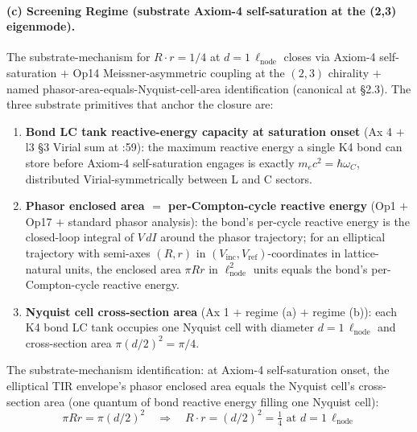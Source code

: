 \paragraph{(c) Screening Regime (substrate Axiom-4 self-saturation at the (2,3) eigenmode).}
The substrate-mechanism for $R \cdot r = 1/4$ at $d = 1\,\ell_\text{node}$ closes via Axiom-4 self-saturation $+$ Op14 Meissner-asymmetric coupling at the $(2,3)$ chirality $+$ named phasor-area-equals-Nyquist-cell-area identification (canonical at  \S2.3). The three substrate primitives that anchor the closure are:

\begin{enumerate}
\item \textbf{Bond LC tank reactive-energy capacity at saturation onset} (Ax 4 $+$ l3 \S3 Virial sum at :59): the maximum reactive energy a single K4 bond can store before Axiom-4 self-saturation engages is exactly $m_e c^2 = \hbar \omega_C$, distributed Virial-symmetrically between L and C sectors.
\item \textbf{Phasor enclosed area $=$ per-Compton-cycle reactive energy} (Op1 $+$ Op17 $+$ standard phasor analysis): the bond's per-cycle reactive energy is the closed-loop integral of $V\, dI$ around the phasor trajectory; for an elliptical trajectory with semi-axes $(R, r)$ in $(V_\text{inc}, V_\text{ref})$-coordinates in lattice-natural units, the enclosed area $\pi R r$ in $\ell_\text{node}^2$ units equals the bond's per-Compton-cycle reactive energy.
\item \textbf{Nyquist cell cross-section area} (Ax 1 $+$ regime (a) $+$ regime (b)): each K4 bond LC tank occupies one Nyquist cell with diameter $d = 1\,\ell_\text{node}$ and cross-section area $\pi(d/2)^2 = \pi/4$.
\end{enumerate}

The substrate-mechanism identification: at Axiom-4 self-saturation onset, the elliptical TIR envelope's phasor enclosed area equals the Nyquist cell's cross-section area (one quantum of bond reactive energy filling one Nyquist cell):
\begin{equation}
    \pi R r = \pi (d/2)^2 \quad \Rightarrow \quad \boxed{R \cdot r = (d/2)^2 = \tfrac{1}{4} \text{ at } d = 1\,\ell_\text{node}}
    \label{eq:screening_constraint}
\end{equation}

